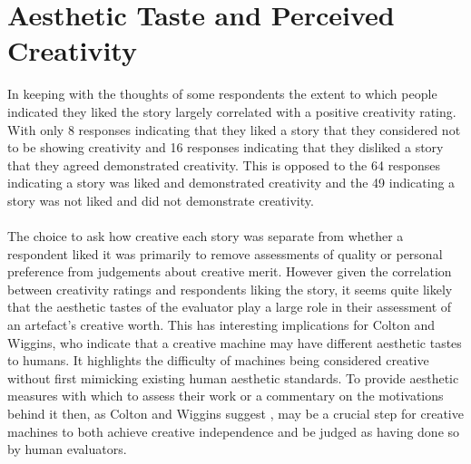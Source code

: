\documentclass[letterpaper]{article}
\begin{document}
\section{Aesthetic Taste and Perceived Creativity} \label{sec:aesthetics}
In keeping with the thoughts of some respondents the extent to which people indicated they liked the story largely correlated with a positive creativity rating. With only 8 responses indicating that they liked a story that they considered not to be showing creativity and 16 responses indicating that they disliked a story that they agreed demonstrated creativity. This is opposed to the 64 responses indicating a story was liked and demonstrated creativity and the 49 indicating a story was not liked and did not demonstrate creativity.\\
\\The choice to ask how creative each story was separate from whether a respondent liked it was primarily to remove assessments of quality or personal preference from judgements about creative merit. However given the correlation between creativity ratings and respondents liking the story, it seems quite likely that the aesthetic tastes of the evaluator play a large role in their assessment of an artefact's creative worth. This has interesting implications for Colton and Wiggins, who indicate that a creative machine may have different aesthetic tastes to humans. It highlights the difficulty of machines being considered creative without first mimicking existing human aesthetic standards. To provide aesthetic measures with which to assess their work or a commentary on the motivations behind it then, as Colton and Wiggins suggest \cite{Colton_computationalcreativity}, may be a crucial step for creative machines to both achieve creative independence and be judged as having done so by human evaluators.

\end{document}
